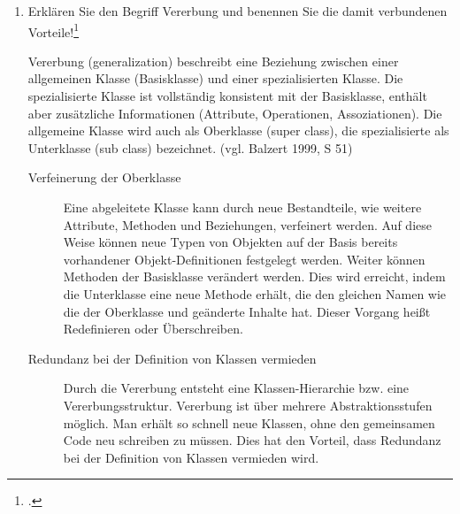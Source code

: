 \documentclass{bschlangaul-aufgabe}
\begin{document}

\begin{enumerate}


\item Erklären Sie den Begriff Vererbung  und benennen
Sie die damit verbundenen Vorteile!\footcite{examen:66112:2006:09}

\begin{bAntwort}
Vererbung (generalization) beschreibt eine Beziehung zwischen einer
allgemeinen Klasse (Basisklasse) und einer spezialisierten Klasse. Die
spezialisierte Klasse ist vollständig konsistent mit der Basisklasse,
enthält aber zusätzliche Informationen (Attribute, Operationen,
Assoziationen). Die allgemeine Klasse wird auch als Oberklasse (super
class), die spezialisierte als Unterklasse (sub class) bezeichnet.
(vgl. Balzert 1999, S 51)


\begin{description}
\item[Verfeinerung der Oberklasse]

Eine abgeleitete Klasse kann durch neue Bestandteile, wie weitere
Attribute, Methoden und Beziehungen, verfeinert werden. Auf diese Weise
können neue Typen von Objekten auf der Basis bereits vorhandener
Objekt-Definitionen festgelegt werden. Weiter können Methoden der
Basisklasse verändert werden. Dies wird erreicht, indem die Unterklasse
eine neue Methode erhält, die den gleichen Namen wie die der Oberklasse
und geänderte Inhalte hat. Dieser Vorgang heißt Redefinieren oder
Überschreiben.

\item[Redundanz bei der Definition von Klassen vermieden]

Durch die Vererbung entsteht eine Klassen-Hierarchie bzw. eine
Vererbungsstruktur. Vererbung ist über mehrere Abstraktionsstufen
möglich. Man erhält so schnell neue Klassen, ohne den gemeinsamen Code
neu schreiben zu müssen. Dies hat den Vorteil, dass Redundanz bei der
Definition von Klassen vermieden wird.


\end{description}
\end{bAntwort}
\end{enumerate}
\end{document}
